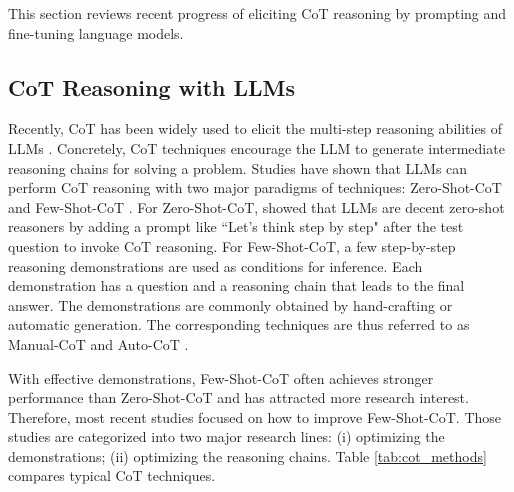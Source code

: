 \documentclass[nohyperref]{article}
\theoremstyle{plain}
\theoremstyle{definition}
\theoremstyle{remark}
\begin{document}
This section reviews recent progress of eliciting CoT reasoning by prompting and fine-tuning language models.

\subsection{CoT Reasoning with LLMs}
Recently, CoT has been widely used to elicit the multi-step reasoning abilities of LLMs \citep{cot_wei}. Concretely, CoT techniques encourage the LLM to generate intermediate reasoning chains for solving a problem. Studies have shown that LLMs can perform CoT reasoning with two major paradigms of techniques: Zero-Shot-CoT \citep{kojima2022large} and Few-Shot-CoT \citep{cot_wei,zhang2022automatic}. For Zero-Shot-CoT, \citet{kojima2022large} showed that LLMs are decent zero-shot reasoners by adding a prompt like ``Let’s think step by step" after the test question to invoke CoT reasoning. For Few-Shot-CoT, a few step-by-step reasoning demonstrations are used as conditions for inference. Each demonstration has a question and a reasoning chain that leads to the final answer. The demonstrations are commonly obtained by hand-crafting or automatic generation. The corresponding techniques are thus referred to as Manual-CoT \citep{cot_wei} and Auto-CoT \citep{zhang2022automatic}. 

With effective demonstrations, Few-Shot-CoT often achieves stronger performance than Zero-Shot-CoT and has attracted more research interest. Therefore, most recent studies focused on how to improve Few-Shot-CoT. Those studies are categorized into two major research lines: (i) optimizing the demonstrations; (ii) optimizing the reasoning chains. Table \ref{tab:cot_methods} compares typical CoT techniques.
\end{document}
